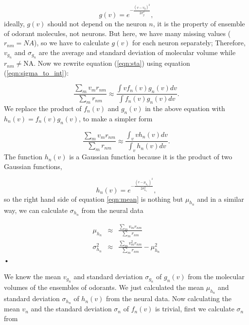 \documentclass[11pt]{paper} %
\begin{document}
\begin{equation}
	g(v) = e^{-\frac{(v- v_{g})^2}{2 \sigma_{g}^2}},
	\label{eqn:hist-volumes}
\end{equation}
ideally, $g(v)$ should not depend on the neuron $n$, 
it is the property of ensemble of odorant molecules, not neurons. 
But here, we have many missing values ($r_{nm} = NA$), 
so we have to calculate $g(v)$ for each neuron separately; 
Therefore, $v_{g_n}$ and $\sigma_{g_n}$ are the average and standard deviation of molecular volume while $r_{nm} \neq \text{NA}$.
Now we rewrite equation (\ref{eqn:sta}) using equation (\ref{eqn:sigma_to_int}):

\begin{equation}
	\frac{\displaystyle \sum_{m} v_m r_{nm}}{\displaystyle \sum_{m} r_{nm}} \approx \frac{\displaystyle \int v f_n(v) g_n(v) dv}{\displaystyle \int f_n(v) g_n(v) dv}.
	\label{eqn:sta_int}
\end{equation}
We replace the product of $f_n(v)$ and $g_n(v)$ in the above equation with $h_n(v) = f_n(v) g_n(v)$, to make a simpler form

\begin{equation}
	\frac{\displaystyle \sum_{m} v_m r_{nm}}{\displaystyle \sum_{m} r_{nm}} \approx \frac{\displaystyle \int_v v h_n(v) dv}{ \displaystyle \int_v  h_n(v) dv }.
	\label{eqn:mean}
\end{equation}
The function $h_n(v)$ is a Gaussian function because it is the product of two Gaussian functions, 

\begin{equation}
h_n(v) = e^{-\frac{(v-\mu_{h_n})^2}{2\sigma_{h_n}^2}}, 
\end{equation}
so the right hand side of equation \ref{eqn:mean} is nothing but $\mu_{h_n}$ and 
in a similar way, we can calculate $\sigma_{h_n}$ from the neural data

\begin{eqnarray}
	\mu_{h_n} &\approx& \frac{\displaystyle \sum_{m} v_m r_{nm}}{\displaystyle \sum_{m} r_{nm}} \\
	\sigma_{h_n}^2 &\approx& \frac{\displaystyle \sum_{m} v_m^2 r_{nm}}{\displaystyle \sum_{m} r_{nm}} - \mu_{h_n}^2
	\label{eqn:final_h}
\end{eqnarray}•


We knew the mean $v_{g_n}$ and standard deviation $\sigma_{g_n}$ of $g_n(v)$ from the molecular volumes of the ensembles of odorants. 
We just calculated the mean $\mu_{h_n}$ and standard deviation $\sigma_{h_n}$ of $h_n(v)$ from the neural data.
Now calculating the mean $v_n$ and the standard deviation $\sigma_n$ of $f_n(v)$ is trivial,
first we calculate $\sigma_n$ from 
\end{document}
